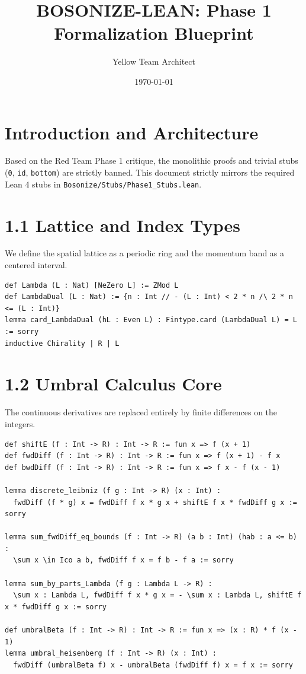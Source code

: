 \documentclass[12pt]{article}
\title{BOSONIZE-LEAN: Phase 1 Formalization Blueprint}
\author{Yellow Team Architect}
\date{\today}
\begin{document}
\maketitle

\section{Introduction and Architecture}
Based on the Red Team Phase 1 critique, the monolithic proofs and trivial stubs (\texttt{0}, \texttt{id}, \texttt{bottom}) are strictly banned. This document strictly mirrors the required Lean 4 stubs in \texttt{Bosonize/Stubs/Phase1\_Stubs.lean}. 

\section{1.1 Lattice and Index Types}
We define the spatial lattice as a periodic ring and the momentum band as a centered interval.
\begin{lstlisting}[language=lean]
def Lambda (L : Nat) [NeZero L] := ZMod L
def LambdaDual (L : Nat) := {n : Int // - (L : Int) < 2 * n /\ 2 * n <= (L : Int)}
lemma card_LambdaDual (hL : Even L) : Fintype.card (LambdaDual L) = L := sorry
inductive Chirality | R | L
\end{lstlisting}

\section{1.2 Umbral Calculus Core}
The continuous derivatives are replaced entirely by finite differences on the integers.
\begin{lstlisting}[language=lean]
def shiftE (f : Int -> R) : Int -> R := fun x => f (x + 1)
def fwdDiff (f : Int -> R) : Int -> R := fun x => f (x + 1) - f x
def bwdDiff (f : Int -> R) : Int -> R := fun x => f x - f (x - 1)

lemma discrete_leibniz (f g : Int -> R) (x : Int) :
  fwdDiff (f * g) x = fwdDiff f x * g x + shiftE f x * fwdDiff g x := sorry

lemma sum_fwdDiff_eq_bounds (f : Int -> R) (a b : Int) (hab : a <= b) :
  \sum x \in Ico a b, fwdDiff f x = f b - f a := sorry

lemma sum_by_parts_Lambda (f g : Lambda L -> R) :
  \sum x : Lambda L, fwdDiff f x * g x = - \sum x : Lambda L, shiftE f x * fwdDiff g x := sorry

def umbralBeta (f : Int -> R) : Int -> R := fun x => (x : R) * f (x - 1)
lemma umbral_heisenberg (f : Int -> R) (x : Int) :
  fwdDiff (umbralBeta f) x - umbralBeta (fwdDiff f) x = f x := sorry
\end{lstlisting}
\end{document}
